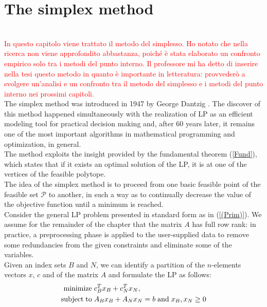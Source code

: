 \documentclass[a4paper,10 pt,titlepage,twoside]{book}
\theoremstyle{plain}
\theoremstyle{definition}
\theoremstyle{remark}
\begin{document}
\chapter{The simplex method}\\
\textcolor{red}{In questo capitolo viene trattato il metodo del simplesso. Ho notato che nella ricerca non viene approfondito abbastanza, poiché è stata elaborato un confronto empirico solo tra i metodi del punto interno. Il professore mi ha detto di inserire nella tesi questo metodo in quanto è importante in letteratura: provvederò a svolgere un'analisi e un confronto tra il metodo del simplesso e i metodi del punto interno nei prossimi capitoli.}\\
The simplex method was introduced in 1947 by George Dantzig \cite{DAN1}. The discover of this method happened simultaneously with the realization of LP as an efficient modeling tool for practical decision making and, after 60 years later, it remains one of the most important algorithms in mathematical programming and
optimization, in general.\\
The method exploits the insight provided by the fundamental theorem
(\ref{Fund}), which states that if it exists an optimal solution of the LP, it is at one of the vertices of the feasible polytope. \\
The idea of the simplex method is to proceed from one basic feasible point of the feasible set $\mathcal{P}$ to another, in such a way as to continually decrease the value of the objective
function until a minimum is reached.\\ Consider the general LP problem presented in standard form as in (\ref{(Prim)}).
We assume for the remainder of the chapter that the matrix $A$ has full row rank: in practice, a preprocessing phase is applied to the user-supplied data to remove some
redundancies from the given constraints and eliminate some of the variables.\\Given an index sets $B$ and $N$, we can identify a partition of the $n$-elements vectors $x$, $c$ and of the matrix $A$ and formulate the LP as follows:
\begin{equation}
\begin{split}
\text{minimize\;} &c^{T}_{B}x_{B}+c^{T}_{N}x_{N},\\
\text{subject\;to\;}&A_{B}x_{B}+A_{N}x_{N} = b\text{\;and\;}x_{B}, x_{N}\geq0
\end{split}
\end{equation}
\end{document}
